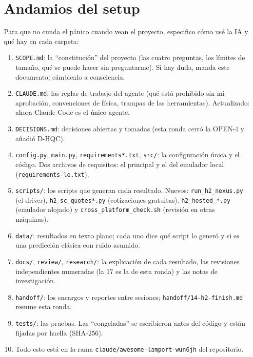 \documentclass[11pt,a4paper]{article}
\begin{document}
\section{Andamios del setup}
Para que no cunda el p\'anico cuando vean el proyecto, especifico c\'omo us\'e la IA y qu\'e hay en cada carpeta:
\begin{enumerate}
  \item \texttt{SCOPE.md}: la ``constituci\'on'' del proyecto (las cuatro preguntas, los l\'imites de tama\~no, qu\'e se
    puede hacer sin preguntarme). Si hay duda, manda este documento; c\'ambienlo a consciencia.
  \item \texttt{CLAUDE.md}: las reglas de trabajo del agente (qu\'e est\'a prohibido sin mi aprobaci\'on, convenciones de
    f\'isica, trampas de las herramientas). Actualizado: ahora Claude Code es el \'unico agente.
  \item \texttt{DECISIONS.md}: decisiones abiertas y tomadas (esta ronda cerr\'o la OPEN-4 y a\~nadi\'o D-HQC).
  \item \texttt{config.py}, \texttt{main.py}, \texttt{requirements*.txt}, \texttt{src/}: la configuraci\'on \'unica y el
    c\'odigo. Dos archivos de requisitos: el principal y el del emulador local (\texttt{requirements-le.txt}).
  \item \texttt{scripts/}: los scripts que generan cada resultado. Nuevos: \texttt{run\_h2\_nexus.py} (el driver),
    \texttt{h2\_sc\_quotes*.py} (cotizaciones gratuitas), \texttt{h2\_hosted\_*.py} (emulador alojado) y
    \texttt{cross\_platform\_check.sh} (revisi\'on en otras m\'aquinas).
  \item \texttt{data/}: resultados en texto plano; cada uno dice qu\'e script lo gener\'o y si es una predicci\'on cl\'asica con ruido asumido.
  \item \texttt{docs/}, \texttt{review/}, \texttt{research/}: la explicaci\'on de cada resultado, las revisiones
    independientes numeradas (la 17 es la de esta ronda) y las notas de investigaci\'on.
  \item \texttt{handoff/}: los encargos y reportes entre sesiones; \texttt{handoff/14-h2-finish.md} resume esta ronda.
  \item \texttt{tests/}: las pruebas. Las ``congeladas'' se escribieron antes del c\'odigo y est\'an fijadas por huella (SHA-256).
  \item Todo esto est\'a en la rama \texttt{claude/awesome-lamport-wun6jh} del repositorio.
\end{enumerate}
\end{document}
